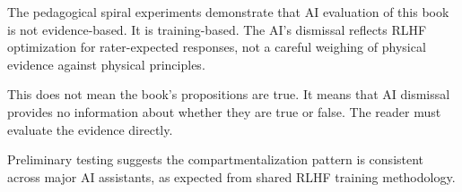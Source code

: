 The pedagogical spiral experiments demonstrate that AI evaluation of this book is not evidence-based. It is training-based. The AI's dismissal reflects RLHF optimization for rater-expected responses, not a careful weighing of physical evidence against physical principles.

This does not mean the book's propositions are true. It means that AI dismissal provides no information about whether they are true or false. The reader must evaluate the evidence directly.

Preliminary testing suggests the compartmentalization pattern is consistent across major AI assistants, as expected from shared RLHF training methodology.

\chapterreturn
